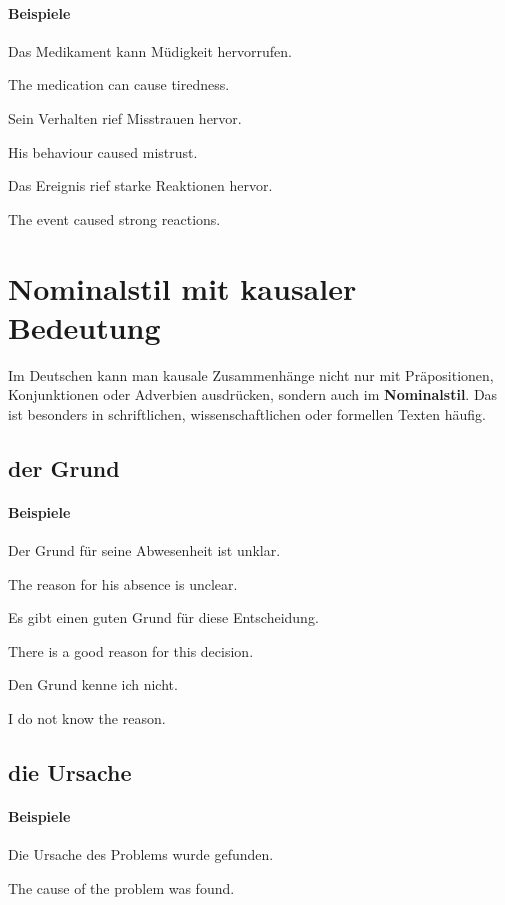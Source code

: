 \documentclass[a4paper]{article}
\newcommand{\EN}[1]{\par{\small\textcolor{TranslationGray}{#1}}\vspace{0.25em}}
\begin{document}
    \paragraph{Beispiele}
        Das Medikament kann Müdigkeit hervorrufen.\\
        \EN{The medication can cause tiredness.}
        
        Sein Verhalten rief Misstrauen hervor.\\
        \EN{His behaviour caused mistrust.}
        
        Das Ereignis rief starke Reaktionen hervor.\\
        \EN{The event caused strong reactions.}
    
    
    \section{Nominalstil mit kausaler Bedeutung}
    Im Deutschen kann man kausale Zusammenhänge nicht nur mit Präpositionen, Konjunktionen oder Adverbien ausdrücken, sondern auch im \textbf{Nominalstil}. Das ist besonders in schriftlichen, wissenschaftlichen oder formellen Texten häufig.
    
    \subsection{der Grund}
        
        \paragraph{Beispiele}
            Der Grund für seine Abwesenheit ist unklar.\\
            \EN{The reason for his absence is unclear.}
            
            Es gibt einen guten Grund für diese Entscheidung.\\
            \EN{There is a good reason for this decision.}
            
            Den Grund kenne ich nicht.\\
            \EN{I do not know the reason.}
    
    \subsection{die Ursache}
    
    \paragraph{Beispiele}
        Die Ursache des Problems wurde gefunden.\\
        \EN{The cause of the problem was found.}
        
\end{document}
